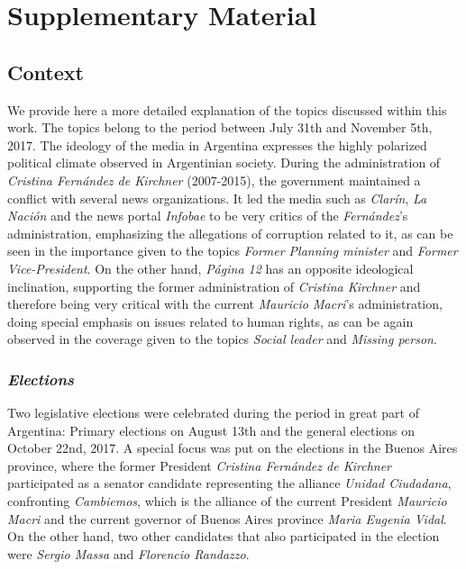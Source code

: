 \documentclass{bmcart}
\begin{document}
\newpage
\section*{Supplementary Material}
\subsection*{Context}
\label{sec:Context}

\par We provide here a more detailed explanation of the topics discussed within this work. The topics belong to the period between July 31th and November 5th, 2017.
The ideology of the media in Argentina expresses the highly polarized political climate observed in Argentinian society.
During the administration of \emph{Cristina Fern\'andez de Kirchner} (2007-2015), the government maintained a conflict with several news organizations.
It led the media such as \emph{Clar\'in}, \emph{La Naci\'on} and the news portal \emph{Infobae} to be very critics of the \emph{Fern\'andez}'s administration, emphasizing the allegations of corruption related to it, as can be seen in the importance given to the topics \emph{Former Planning minister} and \emph{Former Vice-President}.
On the other hand, \emph{P\'agina 12} has an opposite ideological inclination, supporting the former administration of \emph{Cristina Kirchner} and therefore being very critical with the current \emph{Mauricio Macri}'s administration, doing special emphasis on issues related to human rights, as can be again observed in the coverage given to the topics \emph{Social leader} and \emph{Missing person}.

\subsubsection*{\emph{Elections}}
\par Two legislative elections were celebrated during the period in great part of Argentina: Primary elections on August 13th and the general elections on October 22nd, 2017. 
A special focus was put on the elections in the Buenos Aires province, where the former President \emph{Cristina Fern\'andez de Kirchner} participated as a senator candidate representing the alliance \emph{Unidad Ciudadana}, confronting \emph{Cambiemos}, which is the alliance of the current President \emph{Mauricio Macri} and the current governor of Buenos Aires province \emph{Maria Eugenia Vidal}.
On the other hand, two other candidates that also participated in the election were \emph{Sergio Massa} and \emph{Florencio Randazzo}.
 
\end{document}
